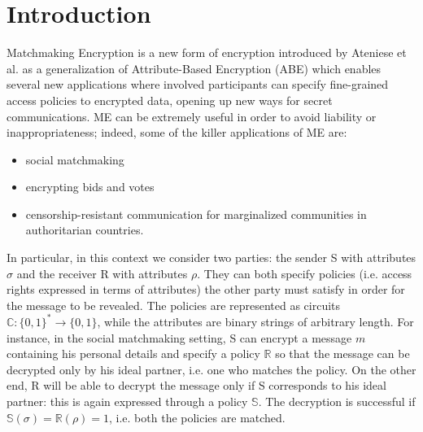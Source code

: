 \chapter{Introduction}
Matchmaking Encryption is a new form of encryption introduced by Ateniese et al. \cite{Ateniese} as a generalization of Attribute-Based Encryption (ABE) \cite{Sahai} which enables several new applications where involved participants can specify fine-grained access policies to encrypted data, opening up new ways for secret communications.
ME can be extremely useful in order to avoid liability or inappropriateness; indeed, some of the killer applications of ME are:
\begin{itemize}
    \item social matchmaking
    \item encrypting bids and votes
    \item censorship-resistant communication for marginalized communities in authoritarian countries.
\end{itemize}
In particular, in this context we consider two parties: the sender S with attributes $\sigma$ and the receiver R with attributes $\rho$.
They can both specify policies (i.e. access rights expressed in terms of attributes) the other party must satisfy in order for the message to be revealed.
The policies are represented as circuits $\mathbb{C} : \{0, 1\}^* \to \{0, 1\}$, while the attributes are binary strings of arbitrary length.
For instance, in the social matchmaking setting, S can encrypt a message $m$ containing his personal details and specify a policy $\mathbb{R}$ so that the message can be decrypted only by his ideal partner, i.e. one who matches the policy.
On the other end, R will be able to decrypt the message only if S corresponds to his ideal partner: this is again expressed through a policy $\mathbb{S}$. The decryption is successful if $\mathbb{S}(\sigma) = \mathbb{R}(\rho) = 1$, i.e. both the policies are matched.

